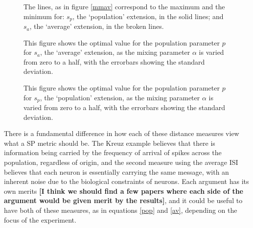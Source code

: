 \begin{figure}[htb]

\caption{The lines, as in figure \ref{mmav} correspond to the maximum and the minimum for: $s_p$, the \lq{}population\rq{} extension, in the solid lines; and $s_a$, the \lq{}average\rq{} extension, in the broken lines.}
\end{figure}

\begin{figure}[htb]

\caption{This figure shows the optimal value for the population parameter $p$ for $s_a$, the \lq{}average\rq{} extension, as the mixing parameter $\alpha$ is varied from zero to a half, with the errorbars showing the standard deviation.}
\end{figure}

\begin{figure}[htb]

\caption{This figure shows the optimal value for the population parameter $p$ for $s_p$, the \lq{}population\rq{} extension, as the mixing parameter $\alpha$ is varied from zero to a half, with the errorbars showing the standard deviation.}
\end{figure}
%

There is a fundamental difference in how each of these distance measures view what a SP metric should be.  The Kreuz example believes that there is information being carried by the frequency of arrival of spikes across the population, regardless of origin, and the second measure using the average ISI believes that each neuron is essentially carrying the same message, with an inherent noise due to the biological constraints of neurons.  Each argument has its own merits {\bf[I think we should find a few papers where each side of the argument would be given merit by the results]}, and it could be useful to have both of these measures, as in equations \ref{pop} and \ref{av}, depending on the focus of the experiment.

